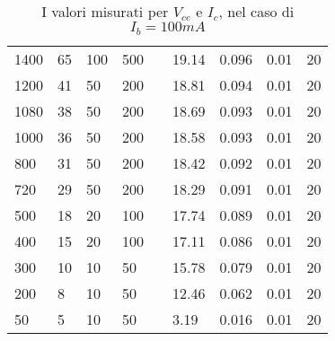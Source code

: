 \documentclass{article}
\begin{document}
\begin{table}[H]
\begin{tabular}{|l|l|l|l|l|l|l|l|l|}
        1400          & 65                        & 100                       & 500                        &  & 19.14      & 0.096                      & 0.01                       & 20                         \\ \cline{1-4} \cline{6-9}
        1200          & 41                        & 50                        & 200                        &  & 18.81      & 0.094                      & 0.01                       & 20                         \\ \cline{1-4} \cline{6-9}
        1080          & 38                        & 50                        & 200                        &  & 18.69      & 0.093                      & 0.01                       & 20                         \\ \cline{1-4} \cline{6-9}
        1000          & 36                        & 50                        & 200                        &  & 18.58      & 0.093                      & 0.01                       & 20                         \\ \cline{1-4} \cline{6-9}
        800           & 31                        & 50                        & 200                        &  & 18.42      & 0.092                      & 0.01                       & 20                         \\ \cline{1-4} \cline{6-9}
        720           & 29                        & 50                        & 200                        &  & 18.29      & 0.091                      & 0.01                       & 20                         \\ \cline{1-4} \cline{6-9}
        500           & 18                        & 20                        & 100                        &  & 17.74      & 0.089                      & 0.01                       & 20                         \\ \cline{1-4} \cline{6-9}
        400           & 15                        & 20                        & 100                        &  & 17.11      & 0.086                      & 0.01                       & 20                         \\ \cline{1-4} \cline{6-9}
        300           & 10                        & 10                        & 50                         &  & 15.78      & 0.079                      & 0.01                       & 20                         \\ \cline{1-4} \cline{6-9}
        200           & 8                         & 10                        & 50                         &  & 12.46      & 0.062                      & 0.01                       & 20                         \\ \cline{1-4} \cline{6-9}
        50            & 5                         & 10                        & 50                         &  & 3.19       & 0.016                      & 0.01                       & 20                         \\ \cline{1-4} \cline{6-9}
    \end{tabular}
    \caption{I valori misurati per $V_{ce}$ e $I_c$, nel caso di $I_b=100 mA$}\label{Tabella 2}
    \medskip
\end{table}
\end{document}
